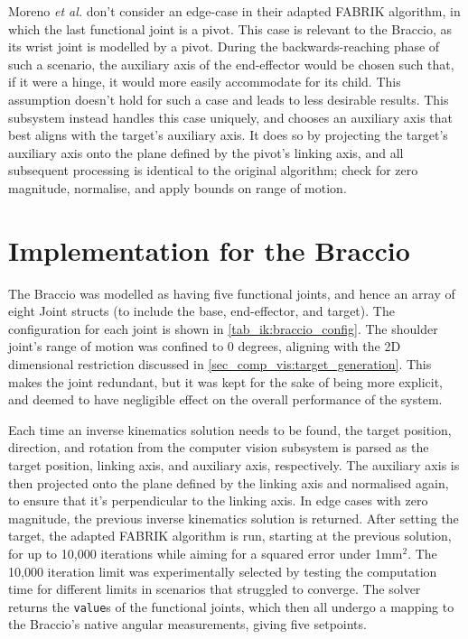 \newpage
Moreno \textit{et al.} don't consider an edge-case in their adapted FABRIK algorithm, in which the last functional joint is a pivot. This case is relevant to the Braccio, as its wrist joint is modelled by a pivot. During the backwards-reaching phase of such a scenario, the auxiliary axis of the end-effector would be chosen such that, if it were a hinge, it would more easily accommodate for its child. This assumption doesn't hold for such a case and leads to less desirable results. This subsystem instead handles this case uniquely, and chooses an auxiliary axis that best aligns with the target's auxiliary axis. It does so by projecting the target's auxiliary axis onto the plane defined by the pivot's linking axis, and all subsequent processing is identical to the original algorithm; check for zero magnitude, normalise, and apply bounds on range of motion.

\section{Implementation for the Braccio}
The Braccio was modelled as having five functional joints, and hence an array of eight Joint structs (to include the base, end-effector, and target). The configuration for each joint is shown in \autoref{tab_ik:braccio_config}. The shoulder joint's range of motion was confined to 0 degrees, aligning with the 2D dimensional restriction discussed in \autoref{sec_comp_vis:target_generation}. This makes the joint redundant, but it was kept for the sake of being more explicit, and deemed to have negligible effect on the overall performance of the system.

Each time an inverse kinematics solution needs to be found, the target position, direction, and rotation from the computer vision subsystem is parsed as the target position, linking axis, and auxiliary axis, respectively. The auxiliary axis is then projected onto the plane defined by the linking axis and normalised again, to ensure that it's perpendicular to the linking axis. In edge cases with zero magnitude, the previous inverse kinematics solution is returned. After setting the target, the adapted FABRIK algorithm is run, starting at the previous solution, for up to 10,000 iterations while aiming for a squared error under 1mm$^2$. The 10,000 iteration limit was experimentally selected by testing the computation time for different limits in scenarios that struggled to converge. The solver returns the \verb|value|s of the functional joints, which then all undergo a mapping to the Braccio's native angular measurements, giving five setpoints.


